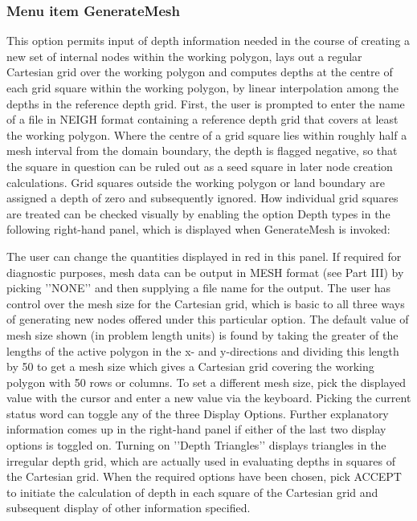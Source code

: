 \documentclass{article}
\begin{document}
\subsubsection[Menu item GenerateMesh]{Menu item GenerateMesh}
This option permits input of depth information needed in the course of creating a new set of internal nodes within the working polygon, lays out a regular Cartesian grid over the working polygon and computes depths at the centre of each grid square within the working polygon, by linear interpolation among the depths in the reference depth grid. First, the user is prompted to enter the name of a file in NEIGH format containing a reference depth grid that covers at least the working polygon. Where the centre of a grid square lies within roughly half a mesh interval from the domain boundary, the depth is flagged negative, so that the square in question can be ruled out as a seed square in later node creation calculations. Grid squares outside the working polygon or land boundary are assigned a depth of zero and subsequently ignored. How individual grid squares are treated can be checked visually by enabling the option {\textquotedbl}Depth types{\textquotedbl} in the following right-hand panel, which is 
displayed when GenerateMesh is invoked:

The user can change the quantities displayed in red in this panel. If required for diagnostic purposes, mesh data can be output in MESH format (see Part III) by picking '{}'NONE'{}' and then supplying a file name for the output. The user has control over the mesh size for the Cartesian grid, which is basic to all three ways of generating new nodes offered under this particular option. The default value of mesh size shown (in problem length units) is found by taking the greater of the lengths of the active polygon in the x- and y-directions and dividing this length by 50 to get a mesh size which gives a Cartesian grid covering the working polygon with 50 rows or columns. To set a different mesh size, pick the displayed value with the cursor and enter a new value via the keyboard. Picking the current status word can toggle any of the three Display Options. Further explanatory information comes up in the right-hand panel if either of the last two display options is toggled on. Turning on '{}'Depth Triangles'{}' 
displays triangles in the irregular depth grid, which are actually used in evaluating depths in squares of the Cartesian grid. When the required options have been chosen, pick ACCEPT to initiate the calculation of depth in each square of the Cartesian grid and subsequent display of other information specified.
\end{document}
